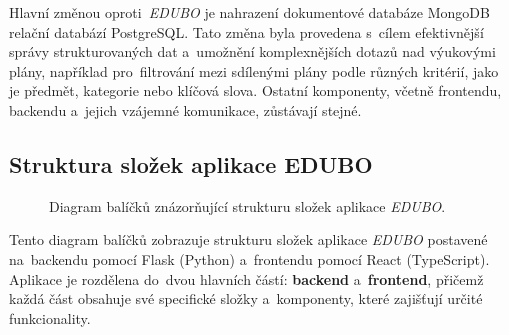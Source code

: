 \documentclass[male,czech,api_bc]{kitheses}
\begin{document}
Hlavní změnou oproti~\textit{EDUBO} je nahrazení dokumentové databáze MongoDB relační databází PostgreSQL. Tato změna byla provedena s~cílem efektivnější správy strukturovaných dat a~umožnění komplexnějších dotazů nad výukovými plány, například pro~filtrování mezi sdílenými plány podle různých kritérií, jako je předmět, kategorie nebo klíčová slova. Ostatní komponenty, včetně frontendu, backendu a~jejich vzájemné komunikace, zůstávají stejné.

\subsection{Struktura složek aplikace EDUBO}

\begin{figure}[H]
	\centering
	\caption{Diagram balíčků znázorňující strukturu složek aplikace \textit{EDUBO}.}
	\label{fig:package-diagram-1}
\end{figure}

Tento diagram balíčků zobrazuje strukturu složek aplikace \textit{EDUBO} postavené na~backendu pomocí Flask (Python) a~frontendu pomocí React (TypeScript). Aplikace je rozdělena do~dvou hlavních částí: \textbf{backend} a~\textbf{frontend}, přičemž každá část obsahuje své specifické složky a~komponenty, které zajišťují určité funkcionality.
\end{document}

